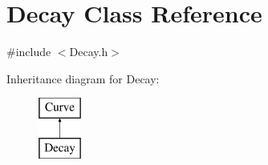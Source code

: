 \hypertarget{class_decay}{}\section{Decay Class Reference}
\label{class_decay}


{\ttfamily \#include $<$Decay.\+h$>$}

Inheritance diagram for Decay\+:\begin{figure}[H]
\begin{center}
\leavevmode
\includegraphics[height=2.000000cm]{class_decay}
\end{center}
\end{figure}
